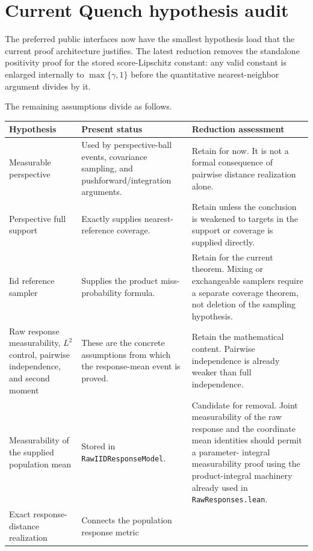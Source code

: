 \documentclass[11pt]{article}
\newcommand{\code}[1]{\texttt{#1}}
\begin{document}
\section{Current Quench hypothesis audit}

The preferred public interfaces now have the smallest hypothesis load that the
current proof architecture justifies.  The latest reduction removes the
standalone positivity proof for the stored score-Lipschitz constant: any valid
constant is enlarged internally to $\max\{\gamma,1\}$ before the quantitative
nearest-neighbor argument divides by it.

The remaining assumptions divide as follows.

\begin{longtable}{>{\raggedright\arraybackslash}p{}
                  >{\raggedright\arraybackslash}p{}
                  >{\raggedright\arraybackslash}p{}}
\toprule
Hypothesis & Present status & Reduction assessment \\
\midrule
\endhead
Measurable perspective & Used by perspective-ball events, covariance sampling,
and pushforward/integration arguments. & Retain for now.  It is not a formal
consequence of pairwise distance realization alone. \\
\addlinespace
Perspective full support & Exactly supplies nearest-reference coverage. &
Retain unless the conclusion is weakened to targets in the support or coverage
is supplied directly. \\
\addlinespace
Iid reference sampler & Supplies the product miss-probability formula. & Retain
for the current theorem.  Mixing or exchangeable samplers require a separate
coverage theorem, not deletion of the sampling hypothesis. \\
\addlinespace
Raw response measurability, $L^2$ control, pairwise independence, and second
moment & These are the concrete assumptions from which the response-mean event
is proved. & Retain the mathematical content.  Pairwise independence is already
weaker than full independence. \\
\addlinespace
Measurability of the supplied population mean & Stored in
\code{RawIIDResponseModel}. & Candidate for removal.  Joint measurability of the
raw response and the coordinate mean identities should permit a parameter-
integral measurability proof using the product-integral machinery already used
in \code{RawResponses.lean}. \\
\addlinespace
Exact response-distance realization & Connects the population response metric

\end{longtable}
\end{document}
